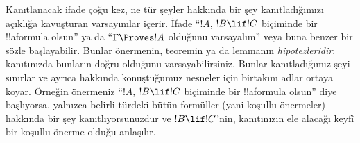 \documentclass[../../../include/open-logic-section]{subfiles}
\begin{document}
Kanıtlanacak ifade çoğu kez, ne tür şeyler hakkında bir şey
kanıtladığımızı açıklığa kavuşturan varsayımlar içerir. İfade ``$!A$,
$!B \lif !C$ biçiminde bir !!a{formula} olsun'' ya da ``$\Gamma
\Proves !A$ olduğunu varsayalım'' veya buna benzer bir sözle
başlayabilir. Bunlar önermenin, teoremin ya da lemmanın
\emph{hipotezleridir}; kanıtınızda bunların doğru olduğunu
varsayabilirsiniz. Bunlar kanıtladığımız şeyi sınırlar ve ayrıca
hakkında konuştuğumuz nesneler için birtakım adlar ortaya koyar.
Örneğin önermeniz ``$!A$, $!B \lif !C$ biçiminde bir !!a{formula}
olsun'' diye başlıyorsa, yalnızca belirli türdeki bütün formüller
(yani koşullu önermeler) hakkında bir şey kanıtlıyorsunuzdur ve
$!B \lif !C$'nin, kanıtınızın ele alacağı keyfî bir koşullu önerme
olduğu anlaşılır.
\end{document}
